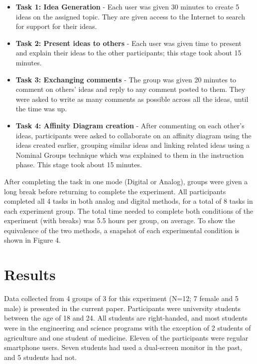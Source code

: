 \documentclass{sigchi}
\begin{document}
\begin{itemize}
\item \textbf{Task 1: Idea Generation } - Each user was given 30 minutes to create 5 ideas on the assigned topic. They are given access to the Internet to search for support for their ideas. 
\item \textbf{Task 2: Present ideas to others } - Each user was given time to present and explain their ideas to the other participants; this stage took about 15 minutes. 
\item \textbf{Task 3: Exchanging comments } - The group was given 20 minutes to comment on others' ideas and reply to any comment posted to them. They were asked to write as many comments as possible across all the ideas, until the time was up. 
\item \textbf{Task 4: Affinity Diagram creation} - After commenting on each other's ideas, participants were asked to collaborate on an affinity diagram using the ideas created earlier, grouping similar ideas and linking related ideas using a Nominal Groups technique which was explained to them in the instruction phase. This stage took about 15 minutes.
\end{itemize}

After completing the task in one mode (Digital or Analog), groups were given a long break before returning to complete the experiment. All participants completed all 4 tasks in both analog and digital methods, for a total of 8 tasks in each experiment group. The total time needed to complete both conditions of the experiment (with breaks) was 5.5 hours per group, on average. To show the equivalence of the two methods, a snapshot of each experimental condition is shown in Figure 4.



\section{Results}

Data collected from 4 groups of 3 for this experiment (N=12; 7 female and 5 male) is presented in the current paper. Participants were university students between the age of 18 and 24. All students are right-handed, and most students were in the engineering and science programs with the exception of 2 students of agriculture and one student of medicine. Eleven of the participants were regular smartphone users. Seven students had used a dual-screen monitor in the past, and 5 students had not. 
\end{document}
